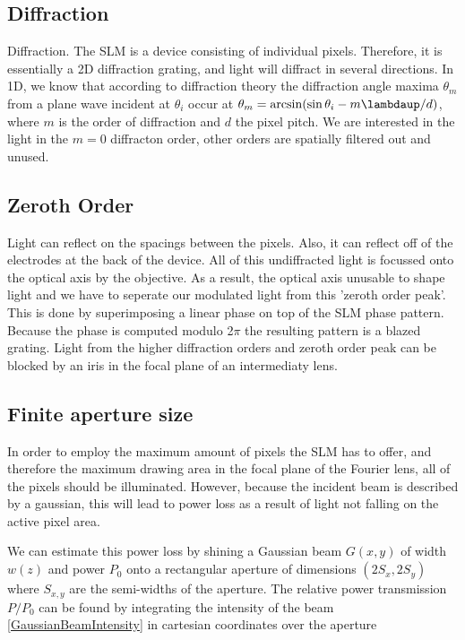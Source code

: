 \subsection{Diffraction}

Diffraction. The SLM is a device consisting of individual pixels. Therefore, it is essentially a 2D diffraction grating, and light will diffract in several directions. In 1D, we know that according to diffraction theory the diffraction angle maxima $\theta_m$ from a plane wave incident at $\theta_i$ occur at $\theta_m = \arcsin(\sin\theta_i - m\lambdaup/d)$, where $m$ is the order of diffraction and $d$ the pixel pitch. We are interested in the light in the $m=0$ diffracton order, other orders are spatially filtered out and unused.

\subsection{Zeroth Order}

Light can reflect on the spacings between the pixels. Also, it can reflect off of the electrodes at the back of the device. All of this undiffracted light is focussed onto the optical axis by the objective. As a result, the optical axis unusable to shape light and we have to seperate our modulated light from this 'zeroth order peak'. This is done by superimposing a linear phase on top of the SLM phase pattern. Because the phase is computed modulo 2$\pi$ the resulting pattern is a blazed grating. Light from the higher diffraction orders and zeroth order peak can be blocked by an iris in the focal plane of an intermediaty lens. 
    
\subsection{Finite aperture size}

In order to employ the maximum amount of pixels the SLM has to offer, and therefore the maximum drawing area in the focal plane of the Fourier lens, all of the pixels should be illuminated. However, because the incident beam is described by a gaussian, this will lead to power loss as a result of light not falling on the active pixel area. 
    
We can estimate this power loss by shining a Gaussian beam $G(x,y)$ of width $w(z)$ and power $P_0$ onto a rectangular aperture of dimensions $(2S_x, 2S_y)$ where $S_{x,y}$ are the semi-widths of the aperture. The relative power transmission $P/P_0$ can be found by integrating the intensity of the beam \cref{GaussianBeamIntensity} in cartesian coordinates over the aperture

